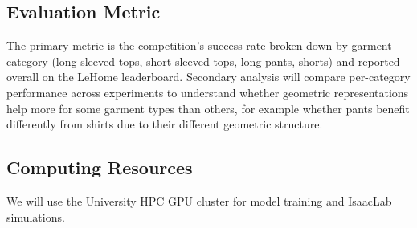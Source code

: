\subsection{Evaluation Metric}

The primary metric is the competition's success rate broken down by garment category (long-sleeved tops, short-sleeved tops, long pants, shorts) and reported overall on the LeHome leaderboard. Secondary analysis will compare per-category performance across experiments to understand whether geometric representations help more for some garment types than others, for example whether pants benefit differently from shirts due to their different geometric structure.

\subsection{Computing Resources}

We will use the University HPC GPU cluster for model training and IsaacLab simulations.

